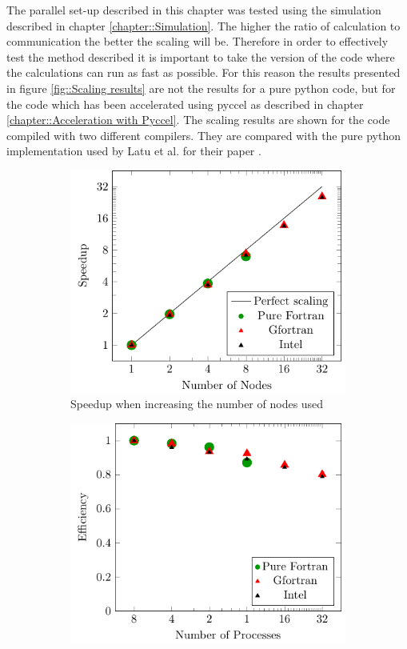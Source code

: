 The parallel set-up described in this chapter was tested using the simulation described in chapter \ref{chapter::Simulation}. The higher the ratio of calculation to communication the better the scaling will be. Therefore in order to effectively test the method described it is important to take the version of the code where the calculations can run as fast as possible. For this reason the results presented in figure \ref{fig::Scaling results} are not the results for a pure python code, but for the code which has been accelerated using pyccel as described in chapter \ref{chapter::Acceleration with Pyccel}. The scaling results are shown for the code compiled with two different compilers. They are compared with the pure python implementation used by Latu et al. for their paper \cite{YamanPaper}.

\begin{figure}
\begin{subfigure}[t]{0.45\textwidth}
 \includegraphics[width=\textwidth]{Figs/PythonScaling/Speedup}
 \caption{\label{fig::Speedup}Speedup when increasing the number of nodes used}
\end{subfigure}
\hspace{.05\textwidth}
\begin{subfigure}[t]{0.45\textwidth}
 \includegraphics[width=\textwidth]{Figs/PythonScaling/Efficiency}

\end{subfigure}
\end{figure}
